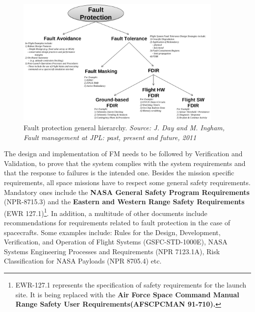 \begin{figure}[htb]
	\begin{center}
	\includegraphics[width=0.9\textwidth]{img/fault_protection_hierarchy.png}
	\caption{Fault protection general hierarchy. \small{\textit{Source: J.
	Day and M. Ingham, Fault management at JPL: past, present and future, 2011}}}
	\label{fig:fault_protection_hierarchy}
	\end{center}
\end{figure}

The design and implementation of FM needs to be followed by Verification and
Validation, to prove that the system complies with the system requirements and
that the response to failures is the intended one. Besides the mission specific
requirements, all space missions have to respect some general safety
requirements. Mandatory ones include the \textbf{NASA General Safety Program
Requirements} (NPR-8715.3) and the \textbf{Eastern and Western Range Safety
Requirements} (EWR 127.1)\footnote{EWR-127.1 represents the specification of
safety requirements for the launch site. It is being replaced with the
\textbf{Air Force Space Command Manual Range Safety User Requirements(AFSCPCMAN
91-710).}}. In addition, a multitude of other documents include recommendations
for requirements related to fault protection in the case of spacecrafts. Some
examples include: Rules for the Design, Development, Verification, and Operation
of Flight Systems (GSFC-STD-1000E), NASA Systems Engineering Processes and
Requirements (NPR 7123.1A), Risk Classification for NASA Payloads (NPR 8705.4)
etc.

